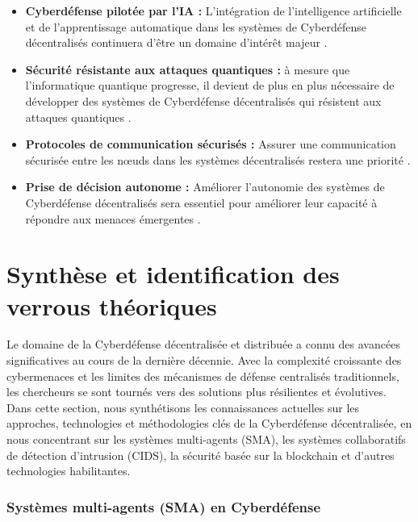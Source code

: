 \begin{itemize}
    \item \textbf{Cyberdéfense pilotée par l'IA :} L'intégration de l'intelligence artificielle et de l'apprentissage automatique dans les systèmes de Cyberdéfense décentralisés continuera d'être un domaine d'intérêt majeur \cite{Kaur2023}.

    \item \textbf{Sécurité résistante aux attaques quantiques :} à mesure que l'informatique quantique progresse, il devient de plus en plus nécessaire de développer des systèmes de Cyberdéfense décentralisés qui résistent aux attaques quantiques \cite{Bernstein2017}.

    \item \textbf{Protocoles de communication sécurisés :} Assurer une communication sécurisée entre les nœuds dans les systèmes décentralisés restera une priorité \cite{Granjal2015}.

    \item \textbf{Prise de décision autonome :} Améliorer l'autonomie des systèmes de Cyberdéfense décentralisés sera essentiel pour améliorer leur capacité à répondre aux menaces émergentes \cite{Nguyen2019}.
\end{itemize}



\section{Synthèse et identification des verrous théoriques}

Le domaine de la Cyberdéfense décentralisée et distribuée a connu des avancées significatives au cours de la dernière décennie. Avec la complexité croissante des cybermenaces et les limites des mécanismes de défense centralisés traditionnels, les chercheurs se sont tournés vers des solutions plus résilientes et évolutives. Dans cette section, nous synthétisons les connaissances actuelles sur les approches, technologies et méthodologies clés de la Cyberdéfense décentralisée, en nous concentrant sur les systèmes multi-agents (SMA), les systèmes collaboratifs de détection d'intrusion (CIDS), la sécurité basée sur la blockchain et d'autres technologies habilitantes.

\subsubsection{Systèmes multi-agents (SMA) en Cyberdéfense}

